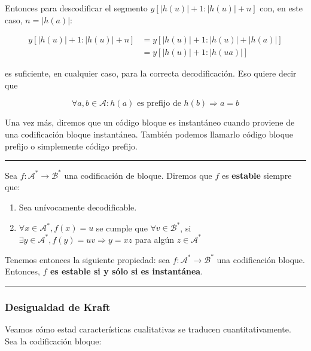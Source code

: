 Entonces para descodificar el segmento
\(y\left[\left|h(u)\right|+1:\left|h(u)\right|+n\right]\) con, en este
caso, \(n = \left|h(a)\right|\):


\begin{align*}
y\left[\left|h(u)\right|+1:\left|h(u)\right|+n\right] &= y\left[\left|h(u)\right|+1:\left|h(u)\right|+\left|h(a)\right|\right]\\
&= y\left[\left|h(u)\right|+1:\left|h(ua)\right|\right]
\end{align*}


es suficiente, en cualquier caso, para la correcta decodificación. Eso
quiere decir que

\[
\forall a,b\in\mathcal{A}:h(a)\text{ es prefijo de }h(b)\Rightarrow a = b
\]

Una vez más, diremos que un código bloque es instantáneo cuando proviene
de una codificación bloque instantánea. También podemos llamarlo código
bloque prefijo o simplemente código prefijo.

\begin{center}\rule{0.5\linewidth}{0.5pt}\end{center}

Sea \(f:\mathcal{A}^*\rightarrow\mathcal{B}^*\) una codificación de
bloque. Diremos que \(f\) es \textbf{estable} siempre que:

\begin{enumerate}
\def\labelenumi{\arabic{enumi}.}
\tightlist
\item
  Sea unívocamente decodificable.
\item
  \(\forall x\in\mathcal{A}^*,f(x)=u\) se cumple que
  \(\forall v\in\mathcal{B}^*\), si
  \(\exists y\in\mathcal{A}^*,f(y)=uv\Rightarrow y=xz\) para algún
  \(z\in\mathcal{A}^*\)
\end{enumerate}

Tenemos entonces la siguiente propiedad: sea
\(f:\mathcal{A}^*\rightarrow\mathcal{B}^*\) una codificación bloque.
Entonces, \textbf{\(f\) es estable si y sólo si es instantánea}.

\begin{center}\rule{0.5\linewidth}{0.5pt}\end{center}

\subsubsection{Desigualdad de Kraft}\label{desigualdad-de-kraft}

Veamos cómo estad características cualitativas se traducen
cuantitativamente. Sea la codificación bloque:

